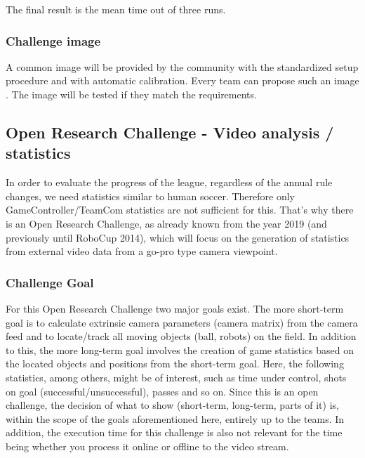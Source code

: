     The final result is the mean time out of three runs.

    \subsubsection{Challenge image}
        \label{sec:Challenge_image}
        A common image will be provided by the community with the standardized setup procedure and with automatic calibration. Every team can propose such an image . The image will be tested if they match the requirements. 

\subsection{Open Research Challenge - Video analysis / statistics}
In order to evaluate the progress of the league, regardless of the annual rule changes, we need statistics similar to human soccer. Therefore only GameController/TeamCom statistics are not sufficient for this. That's why there is an Open Research Challenge, as already known from the year 2019 (and previously until RoboCup 2014), which will focus on the generation of statistics from external video data from a go-pro type camera viewpoint.

    \subsubsection{Challenge Goal}
    For this Open Research Challenge two major goals exist. The more short-term goal is to calculate extrinsic camera parameters (camera matrix) from the camera feed and to locate/track all moving objects (ball, robots) on the field. In addition to this, the more long-term goal involves the creation of game statistics based on the located objects and positions from the short-term goal. Here, the following statistics, among others, might be of interest, such as time under control, shots on goal (successful/unsuccessful), passes and so on. Since this is an open challenge, the decision of what to show (short-term, long-term, parts of it) is, within the scope of the goals aforementioned here, entirely up to the teams. In addition, the execution time for this challenge is also not relevant for the time being whether you process it online or offline to the video stream.    


